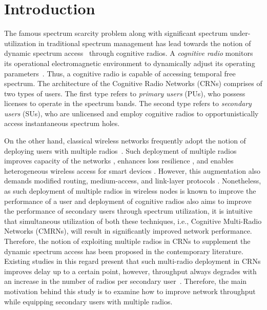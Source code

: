 \documentclass[letterpaper,conference]{IEEEtran}
\begin{document}
\section{Introduction}
The famous spectrum scarcity problem along with significant spectrum under-utilization in traditional spectrum management has lead towards the notion of dynamic spectrum access~\cite{akyildiz2006next} through cognitive radios. A \textit{cognitive radio} monitors its operational electromagnetic environment to dynamically adjust its operating parameters~\cite{Mitola}. Thus, a cognitive radio is capable of accessing temporal free spectrum. The architecture of the Cognitive Radio Networks (CRNs) comprises of two types of users. The first type refers to \textit{primary users} (PUs), who possess licenses to operate in the spectrum bands. The second type refers to \textit{secondary users} (SUs), who are unlicensed and employ cognitive radios to opportunistically access instantaneous spectrum holes.


On the other hand, classical wireless networks frequently adopt the notion of deploying users with multiple radios~\cite{bahl2004reconsidering, adya2004multi}. Such deployment of multiple radios improves capacity of the networks \cite{draves2004routing, bahl2004reconsidering}, enhances loss resilience \cite{miu2005improving}, and enables heterogeneous wireless access for smart devices \cite{song2012performance}. However, this augmentation also demands modified routing, medium-access, and link-layer protocols \cite{kyasanur2006routing, chatterjee2013low}. Nonetheless, as such deployment of multiple radios in wireless nodes is known to improve the performance of a user and  deployment of cognitive radios also aims to improve the performance of secondary users through spectrum utilization, it is intuitive that simultaneous utilization of both these techniques, i.e., Cognitive Multi-Radio Networks (CMRNs), will result in significantly improved network performance. Therefore, the notion of exploiting multiple radios in CRNs to supplement the dynamic spectrum access has been proposed in the contemporary literature. Existing studies in this regard present that such multi-radio deployment in CRNs improves delay up to a certain point, however, throughput always degrades with an increase in the number of radios per secondary user~\cite{khan2015towards}. Therefore, the main motivation behind this study is to examine how to improve network throughput while equipping secondary users with multiple radios.
\end{document}
